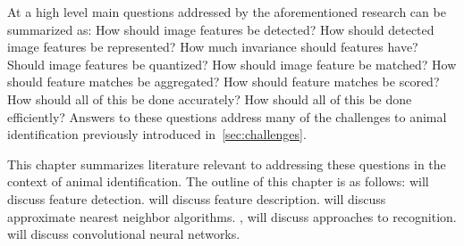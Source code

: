     At a high level main questions addressed by the aforementioned
      research can be summarized as:
    How should image features be detected?
    How should detected image features be represented?
    How much invariance should features have?
    Should image features be quantized?
    How should image feature be matched?
    How should feature matches be aggregated?
    How should feature matches be scored?
    How should all of this be done accurately?
    How should all of this be done efficiently?
    Answers to these questions address many of the challenges to animal
      identification previously introduced in~\cref{sec:challenges}.

    This chapter summarizes literature relevant to addressing these questions
      in the context of animal identification.
    The outline of this chapter is as follows:
     will discuss feature detection.
     will discuss feature description.
     will discuss approximate nearest neighbor algorithms.
    , will discuss approaches to recognition.
     will discuss convolutional neural networks.











        
